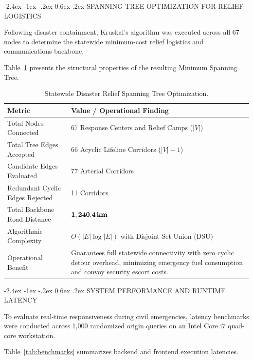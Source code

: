 \documentclass[12pt,oneside]{report}
\makeatletter
\renewcommand{\section}{\@startsection{section}{1}{\z@}%
  {-2.4ex \@plus -1ex \@minus -.2ex}%
  {0.6ex \@plus .2ex}%
  {\normalfont\large\bfseries}}
\makeatother
\begin{document}
\section{SPANNING TREE OPTIMIZATION FOR RELIEF LOGISTICS}

Following disaster containment, Kruskal's algorithm was executed across all 67 nodes to determine the statewide minimum-cost relief logistics and communications backbone.

Table~\ref{tab:mst_summary} presents the structural properties of the resulting Minimum Spanning Tree.

\begin{table}[H]
\centering
\small
\caption{Statewide Disaster Relief Spanning Tree Optimization.}
\label{tab:mst_summary}
\vspace{0.05in}
\begin{tabularx}{\textwidth}{lX}
\toprule
\textbf{Metric} & \textbf{Value / Operational Finding} \\
\midrule
Total Nodes Connected & 67 Response Centers and Relief Camps ($|V|$) \\
Total Tree Edges Accepted & 66 Acyclic Lifeline Corridors ($|V| - 1$) \\
Candidate Edges Evaluated & 77 Arterial Corridors \\
Redundant Cyclic Edges Rejected & 11 Corridors \\
Total Backbone Road Distance & $\mathbf{1,240.4\,\text{\bf km}}$ \\
Algorithmic Complexity & $O(|E| \log |E|)$ with Disjoint Set Union (DSU) \\
Operational Benefit & Guarantees full statewide connectivity with zero cyclic detour overhead, minimizing emergency fuel consumption and convoy security escort costs. \\
\bottomrule
\end{tabularx}
\end{table}

\section{SYSTEM PERFORMANCE AND RUNTIME LATENCY}

To evaluate real-time responsiveness during civil emergencies, latency benchmarks were conducted across 1,000 randomized origin queries on an Intel Core i7 quad-core workstation.

Table~\ref{tab:benchmarks} summarizes backend and frontend execution latencies.
\end{document}

